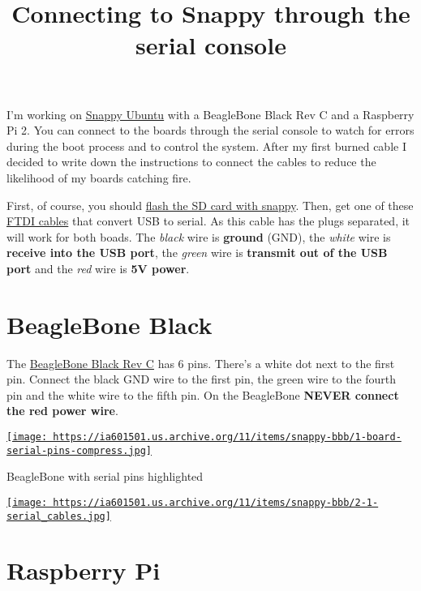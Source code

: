 \documentclass[12pt]{article}
\title{Connecting to Snappy through the serial console }
\begin{document}
I'm working on \href{https://developer.ubuntu.com/en/snappy/}{Snappy Ubuntu}
with a BeagleBone Black Rev C and a Raspberry Pi 2. You can connect to the
boards through the serial console to watch for errors during the boot process
and to control the system. After my first burned cable I decided to write down
the instructions to connect the cables to reduce the likelihood of my boards
catching fire.

First, of course, you should
\href{https://developer.ubuntu.com/en/snappy/start/}{flash the SD card with
snappy}. Then, get one of these \href{http://www.adafruit.com/products/954}
{FTDI cables} that convert USB to serial. As this cable has the plugs
separated, it will work for both boads. The \emph{black} wire is
\textbf{ground} (GND), the \emph{white} wire is \textbf{receive into the USB port}, the \emph{green} wire is \textbf{transmit out of the USB port} and the
\emph{red} wire is \textbf{5V power}.

\section{BeagleBone Black}

The \href{https://www.adafruit.com/product/1876}{BeagleBone Black Rev C} has 6
pins. There's a white dot next to the first pin. Connect the black GND wire to
the first pin, the green wire to the fourth pin and the white wire to the fifth
pin. On the BeagleBone \textbf{NEVER connect the red power wire}.

\begin{center}
  \href{
    https://ia601501.us.archive.org/11/items/snappy-bbb/1-board-serial-pins-compress.jpg}{
    \texttt{[image: 
      https://ia601501.us.archive.org/11/items/snappy-bbb/1-board-serial-pins-compress.jpg]}
  }
  \caption{BeagleBone with serial pins highlighted}
\end{center}

\begin{center}
  \href{
    https://ia601501.us.archive.org/11/items/snappy-bbb/2-1-serial_cables.jpg}{
    \texttt{[image: 
      https://ia601501.us.archive.org/11/items/snappy-bbb/2-1-serial\_cables.jpg]}
  }
\end{center}

\section{Raspberry Pi}
\end{document}
